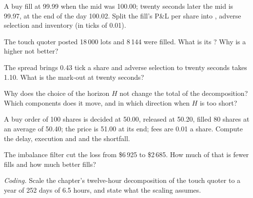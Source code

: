 \begin{exercise}[$\star$]\label{exo:rs:measuring-market-making-and-execution:1}
A buy fill at 99.99 when the mid was 100.00; twenty seconds later the mid is 99.97, at the end of the day 100.02. Split the fill's P\&L per share into , adverse selection and inventory (in ticks of 0.01).
\end{exercise}

\begin{exercise}[$\star$]\label{exo:rs:measuring-market-making-and-execution:2}
The touch quoter posted 18\,000 lots and 8\,144 were filled. What is its ? Why is a higher  not better?
\end{exercise}

\begin{exercise}[$\star$]\label{exo:rs:measuring-market-making-and-execution:3}
The spread brings 0.43 tick a share and adverse selection to twenty seconds takes 1.10. What is the mark-out at twenty seconds?
\end{exercise}

\begin{exercise}[$\star\star$]\label{exo:rs:measuring-market-making-and-execution:4}
Why does the choice of the horizon $H$ not change the total of the decomposition? Which components does it move, and in which direction when $H$ is too short?
\end{exercise}

\begin{exercise}[$\star\star$]\label{exo:rs:measuring-market-making-and-execution:5}
A buy order of 100 shares is decided at 50.00, released at 50.20, filled 80 shares at an average of 50.40; the price is 51.00 at its end; fees are 0.01 a share.
Compute the delay, execution and  and the shortfall.
\end{exercise}

\begin{exercise}[$\star\star$]\label{exo:rs:measuring-market-making-and-execution:6}
The imbalance filter cut the loss from \$6\,925 to \$2\,685. How much of that is fewer fills and how much better fills?
\end{exercise}

\begin{exercise}[$\star\star\star$]\label{exo:rs:measuring-market-making-and-execution:7}
\emph{Coding.} Scale the chapter's twelve-hour decomposition of the touch quoter to a year of 252 days of 6.5 hours, and state what the scaling assumes.
\end{exercise}


